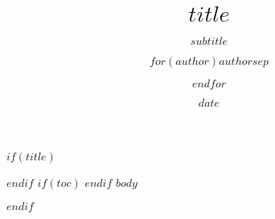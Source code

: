 \documentclass[nols, notitlepage, notoc, sfsidenotes]{tufte-handout}
\title{$title$}
\subtitle{$subtitle$}
\author{$for(author)$$author$$sep$ \and $endfor$}
\date{$date$}
\newlength{\fullwidthlength}
\begin{document}
$if(title)$
\noindent
\begin{minipage}{\fullwidthlength}
\maketitle
\end{minipage} 
$endif$
$if(toc)$
{
\hypersetup{linkcolor=black}
\setcounter{tocdepth}{$toc-depth$}
\tableofcontents
}
$endif$
$body$


$endif$
\end{document}
